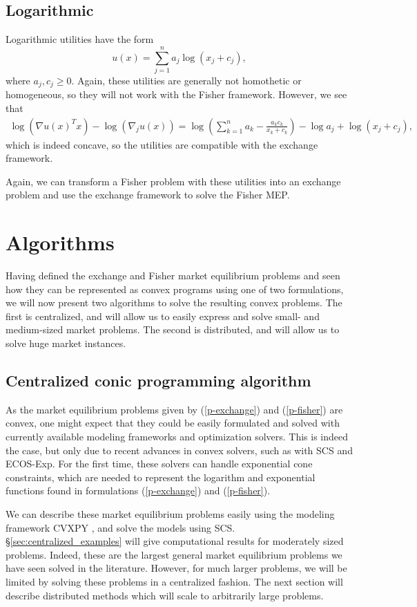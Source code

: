 \documentclass[12pt]{article}
\begin{document}
\subsection{Logarithmic}
Logarithmic utilities have the form
\[
u(x) = \sum_{j=1}^n a_j \log(x_j+ c_j),
\]
where $a_j, c_j \geq 0$.
Again, these utilities are generally not homothetic or
homogeneous, so they will not work with the Fisher framework.
However, we see that 
\begin{align*}
\log(\nabla u(x)^T x) - \log(\nabla_j u(x)) =
\log\left(\sum_{k=1}^n a_k - \frac{a_k c_k}{x_k+c_k} \right) - \log a_j + \log (x_j + c_j),
\end{align*}
which is indeed concave, so the utilities are compatible
with the exchange framework.

Again, we can transform a Fisher problem with these utilities into
an exchange problem and use the exchange framework to solve
the Fisher MEP.

\section{Algorithms}
Having defined the exchange and Fisher market equilibrium problems and seen how they can be represented as convex programs using one of two formulations,
we will now present two algorithms to solve the resulting convex problems.
The first is centralized, and will allow us to easily express and solve small- and medium-sized market problems.
The second is distributed, and will allow us to solve huge market instances.

\label{sec:algorithms}
\subsection{Centralized conic programming algorithm}
\label{sec:centralized}

As the market equilibrium problems given by (\ref{p-exchange}) and (\ref{p-fisher}) are convex, one might expect that they could be easily formulated and solved with currently
available modeling frameworks and optimization solvers.
This is indeed the case, but only due to recent advances in convex solvers,
such as with SCS \cite{scs} and ECOS-Exp. %
For the first time, these solvers can handle exponential cone constraints,
which are needed to represent the logarithm and exponential functions found in 
formulations (\ref{p-exchange}) and (\ref{p-fisher}).

We can describe these market equilibrium problems easily using the modeling
framework CVXPY \cite{cvxpy}, and solve the models using SCS. \S\ref{sec:centralized_examples} will give computational results for moderately sized problems. Indeed, these are the largest general market equilibrium problems we have seen solved in the literature. However, for much larger problems, we will
be limited by solving these problems in a centralized fashion. The next section will describe distributed methods which will scale to arbitrarily large problems.
\end{document}

